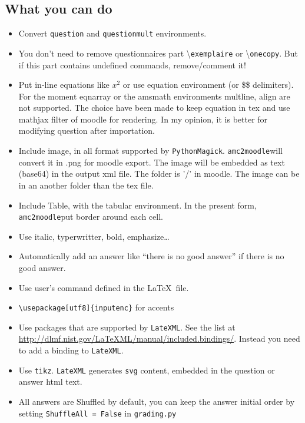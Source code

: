 \documentclass[a4paper]{article}
\newcommand{\amc}{\texttt{amc2moodle}}
\begin{document}
\subsection{What you can do}
\begin{itemize}
\item Convert \texttt{question} and \texttt{questionmult} environments.
\item You don't need to remove questionnaires part \textbackslash \texttt{exemplaire} or \textbackslash \texttt{onecopy}. But if this part contains undefined commands, remove/comment it!
\item Put in-line equations like $x^2$ or use equation environment (or \$\$ delimiters). For the moment eqnarray  or the amsmath environments multline, align are not supported. The choice have been made to keep equation in tex and use mathjax filter of moodle for rendering. In my opinion, it is better for modifying question after importation.
\item Include image, in all format supported by \texttt{PythonMagick}. \amc   will convert it in .png for moodle export. The image will be embedded as text (base64) in the output xml file. The folder is '/' in moodle. The image can be in an another folder than the tex file.
\item Include Table, with the tabular environment. In the present form, \amc put  border around each cell.
\item Use italic, typerwritter, bold, emphasize\dots
\item Automatically add an answer like ``there is no good answer'' if there is no good answer.
\item Use user's command defined in the \LaTeX~file.
\item \texttt{\textbackslash usepackage[utf8]\{inputenc\}}   for accents
\item Use packages that are supported by \texttt{LateXML}. See the list at \url{http://dlmf.nist.gov/LaTeXML/manual/included.bindings/}. Instead you need to add a binding to \texttt{LateXML}.
\item Use \texttt{tikz}. \texttt{LateXML} generates \texttt{svg} content, embedded in the question or answer html text.
\item All answers are Shuffled by default, you can keep the answer initial order by setting \texttt{ShuffleAll = False} in \texttt{grading.py}
\end{itemize}
\end{document}
